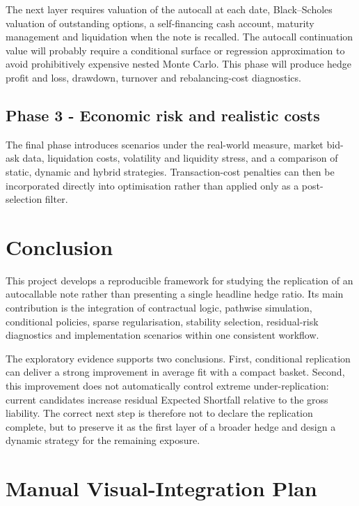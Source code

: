 \documentclass[11pt,a4paper]{article}
\begin{document}
The next layer requires valuation of the autocall at each date, Black--Scholes valuation of outstanding options, a self-financing cash account, maturity management and liquidation when the note is recalled. The autocall continuation value will probably require a conditional surface or regression approximation to avoid prohibitively expensive nested Monte Carlo. This phase will produce hedge profit and loss, drawdown, turnover and rebalancing-cost diagnostics.

\subsection{Phase 3 - Economic risk and realistic costs}

The final phase introduces scenarios under the real-world measure, market bid-ask data, liquidation costs, volatility and liquidity stress, and a comparison of static, dynamic and hybrid strategies. Transaction-cost penalties can then be incorporated directly into optimisation rather than applied only as a post-selection filter.

\section{Conclusion}

This project develops a reproducible framework for studying the replication of an autocallable note rather than presenting a single headline hedge ratio. Its main contribution is the integration of contractual logic, pathwise simulation, conditional policies, sparse regularisation, stability selection, residual-risk diagnostics and implementation scenarios within one consistent workflow.

The exploratory evidence supports two conclusions. First, conditional replication can deliver a strong improvement in average fit with a compact basket. Second, this improvement does not automatically control extreme under-replication: current candidates increase residual Expected Shortfall relative to the gross liability. The correct next step is therefore not to declare the replication complete, but to preserve it as the first layer of a broader hedge and design a dynamic strategy for the remaining exposure.

\appendix

\section{Manual Visual-Integration Plan}
\end{document}
